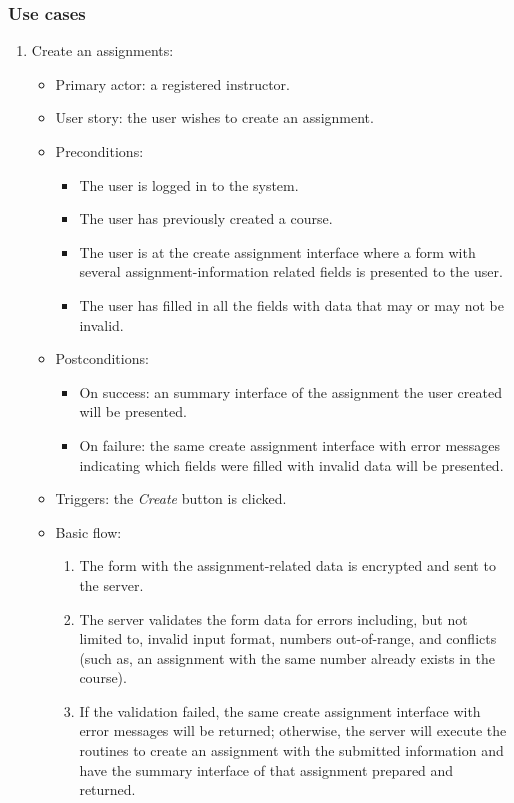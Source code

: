 \subsubsection{Use cases}
\begin{enumerate}
\item Create an assignments:
\begin{itemize}
    \item Primary actor: a registered instructor.
    \item User story: the user wishes to create an assignment.
    \item Preconditions:
        \begin{itemize}
            \item The user is logged in to the system.
            \item The user has previously created a course.
            \item The user is at the create assignment interface where a form
                with several assignment-information related fields is
                presented to the user.
            \item The user has filled in all the fields with data that may
                or may not be invalid.
        \end{itemize}
    \item Postconditions:
        \begin{itemize}
            \item On success: an summary interface of the assignment the user
                created will be presented.
            \item On failure: the same create assignment interface with error
                messages indicating which fields were filled with invalid data
                will be presented.
        \end{itemize}
    \item Triggers: the \emph{Create} button is clicked.
    \item Basic flow:
        \begin{enumerate}
            \item The form with the assignment-related data is encrypted and
                sent to the server.
            \item The server validates the form data for errors  including,
                but not limited to, invalid input format, numbers out-of-range,
                and conflicts (such as, an assignment with the same
                number already exists in the course).
            \item If the validation failed, the same create assignment interface
                with error messages will be returned; otherwise, the server will
                execute the routines to create an assignment with the submitted
                information and have the summary interface of that assignment
                prepared and returned.
        \end{enumerate}
\end{itemize}


\end{enumerate}
